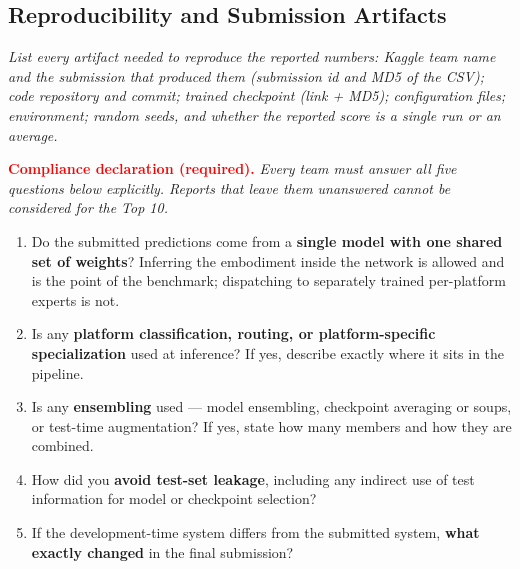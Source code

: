 \documentclass[letterpaper,10pt,conference]{ieeeconf}
\newcommand{\instruction}[1]{\textcolor{instructionblue}{\textit{#1}}}
\begin{document}
\subsection{Reproducibility and Submission Artifacts}

\instruction{
List every artifact needed to reproduce the reported numbers: Kaggle team name and the
submission that produced them (submission id and MD5 of the CSV); code repository and commit;
trained checkpoint (link + MD5); configuration files; environment;
random seeds, and whether the reported
score is a single run or an average.
}

\vspace{0.3em}
\noindent\textcolor{red}{\textbf{Compliance declaration (required).}} \emph{Every team must
answer all five questions below explicitly. Reports that leave them unanswered cannot be
considered for the Top 10.}

\begin{enumerate}
    \item Do the submitted predictions come from a \textbf{single model with one shared set of
    weights}? Inferring the embodiment inside the network is allowed and is the point of the
    benchmark; dispatching to separately trained per-platform experts is not.
    \item Is any \textbf{platform classification, routing, or platform-specific
    specialization} used at inference? If yes, describe exactly where it sits in the pipeline.
    \item Is any \textbf{ensembling} used --- model ensembling, checkpoint averaging or
    soups, or test-time augmentation? If yes, state how many members and how they are combined.
    \item How did you \textbf{avoid test-set leakage}, including any indirect use of test
    information for model or checkpoint selection?
    \item If the development-time system differs from the submitted system, \textbf{what
    exactly changed} in the final submission?
\end{enumerate}
\end{document}
